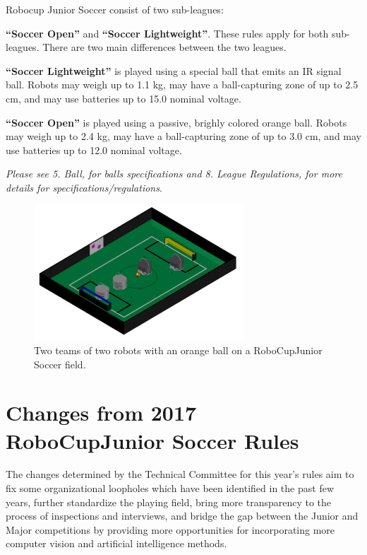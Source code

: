\documentclass{article}
\begin{document}
Robocup Junior Soccer consist of two sub-leagues:

\textbf{``Soccer Open''} and \textbf{``Soccer Lightweight''}. These rules apply
for both sub-leagues. There are two main differences between the two leagues.

\textbf{``Soccer Lightweight''} is played using a special ball that emits an IR
signal ball. Robots may weigh up to 1.1 kg, may have a ball-capturing zone of
up to 2.5 cm, and may use batteries up to 15.0 nominal voltage.

\textbf{``Soccer Open''} is played using a passive, brighly colored orange
ball. Robots may weigh up to 2.4 kg, may have a ball-capturing zone of up to
3.0 cm, and may use batteries up to 12.0 nominal voltage.

\textit{Please see 5. Ball, for balls specifications and 8. League
Regulations, for more details for specifications/regulations}.

\begin{figure}[H]
    \centering
    \includegraphics[width=0.7\textwidth]{media/image1_new.jpeg}
    \caption{Two teams of two robots with an orange ball on a RoboCupJunior
        Soccer field.}
    \label{fig:name}
\end{figure}

\section*{Changes from 2017 RoboCupJunior Soccer Rules}

The changes determined by the Technical Committee for this year's rules aim to
fix some organizational loopholes which have been identified in the past few
years, further standardize the playing field, bring more transparency to the
process of inspections and interviews, and bridge the gap between the Junior
and Major competitions by providing more opportunities for incorporating more
computer vision and artificial intelligence methods.
\end{document}

